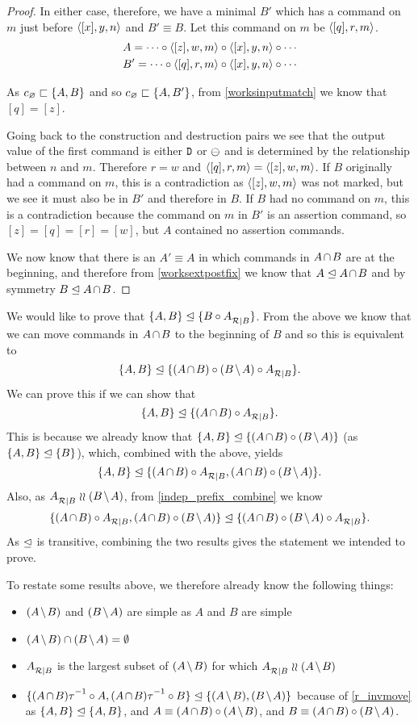 \begin{proof}
In either case, therefore,
we have a minimal $B'$ which has a command on $m$ just before $\langle{[x],y,n}\rangle$ and $B'\equiv B$.
Let this command on $m$ be $\langle{[q],r,m}\rangle$.
\begin{gather*}
A = \cdots\circ  \langle{[z],w,m}\rangle\circ  \langle{[x],y,n}\rangle\circ  \cdots \\
B' = \cdots\circ  \langle{[q],r,m}\rangle\circ  \langle{[x],y,n}\rangle\circ  \cdots
\end{gather*}

As $c_\varnothing\sqsubset{\{{A,B}\}}$ and so $c_\varnothing\sqsubset{\{{A,B'}\}}$, 
from \cref{worksinputmatch}
we know that $[q]=[z]$. 

Going back to the construction and destruction pairs we see that the output value of the first command
is either $\mathtt{D}$ or $\ominus$ and is determined by the relationship between $n$ and $m$.
Therefore $r=w$ and $\langle{[q],r,m}\rangle=\langle{[z],w,m}\rangle$.
If $B$ originally had a command on $m$,
this is a contradiction as $\langle{[z],w,m}\rangle$ was not marked, but we see it must also be in $B'$ and therefore in $B$.
If $B$ had no command on $m$,
this is a contradiction because the command on $m$ in $B'$ is an assertion command, so $[z]=[q]=[r]=[w]$, 
but $A$ contained no assertion commands.

We now know that there is an $A'\equiv A$ in which commands in $\acbnp$
are at the beginning, and therefore 
from \cref{worksextpostfix} we know that
$\worksm{A}{\acbnp}$ and by symmetry $\worksm{B}{\acbnp}$.
\end{proof}

\bigskip


\noindent
We would like to prove that ${\{{A,B}\}}\trianglelefteq{\{{B\circ{A}^{}_{\mathcal{R}|{B}}}\}}$.
From the above we know that we can move commands in $\acbnp$
to the beginning of $B$ and so this is equivalent to
\[ \worksmbb{A,B}{\acb\cc \bma\cc \reca}. \]
We can prove this if we can show that
\[ \worksmbb{A,B}{\acb\cc \reca}. \]
This is because we already know
that $\worksmbb{A,B}{\acb\cc \bma}$ (as ${\{{A,B}\}}\trianglelefteq{\{{B}\}}$),
which, combined with the above, yields
\[ \worksmbb{A,B}{\acb\cc \reca, \acb\cc \bma}. \]
Also, as $\reca\indep\bma$,
from \cref{indep_prefix_combine}
we know
\[ \worksmbb{\acb\cc \reca, \acb\cc \bma}{\acb\cc \bma\cc \reca}. \]
As $\trianglelefteq$ is transitive, combining the two results
gives the statement we intended to prove.


To restate some results above, we therefore already know the following things:
\begin{itemize}
\item $\amb$ and $\bma$ are simple as $A$ and $B$ are simple
\item $\amb \cap \bma = \emptyset$
\item ${A}^{}_{\mathcal{R}|{B}}$ is the largest subset of $\amb$ for which $\reca\indep\amb$
\item $\worksmbb{\acbi\cc A,\acbi\cc B}{\amb, \bma}$ 
because of \cref{r_invmove}
as ${\{{A,B}\}}\trianglelefteq{\{{A,B}\}}$,
and $A\equiv\acb\cc\amb$, and $B\equiv\acb\cc\bma$.
\end{itemize}

